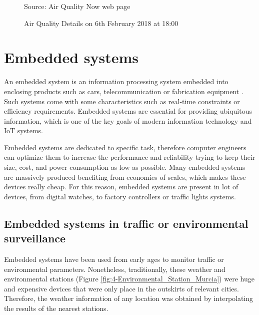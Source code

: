 \begin{figure}[!htbp]
	\centering
	\caption{Air Quality Details on 6th February 2018 at 18:00}
	\label{fig:4-AirQuality-Details}{Source: Air Quality Now web page \cite{airqualitynow}}
\end{figure}



\section{Embedded systems}
An embedded system is an information processing system embedded into enclosing products such as cars, telecommunication or fabrication equipment \cite{Mar16}. Such systems come with some characteristics such as real-time constraints or efficiency requirements. Embedded systems are essential for providing ubiquitous information, which is one of the key goals of modern information technology and \ac{IoT} systems.

Embedded systems are dedicated to specific task, therefore computer engineers can optimize them to increase the performance and reliability trying to keep their size, cost, and power consumption as low as possible. Many embedded systems are massively produced benefiting from economies of scales, which makes these devices really cheap. For this reason, embedded systems are present in lot of devices, from digital watches, to factory controllers or traffic lights systems. 

\subsection{Embedded systems in traffic or environmental surveillance}
Embedded systems have been used from early ages to monitor traffic or environmental parameters. Nonetheless, traditionally, these weather and environmental stations (Figure \ref{fig:4-Environmental_Station_Murcia}) were huge and expensive devices that were only place in the outskirts of relevant cities. Therefore, the weather information of any location was obtained by interpolating the results of the nearest stations.

